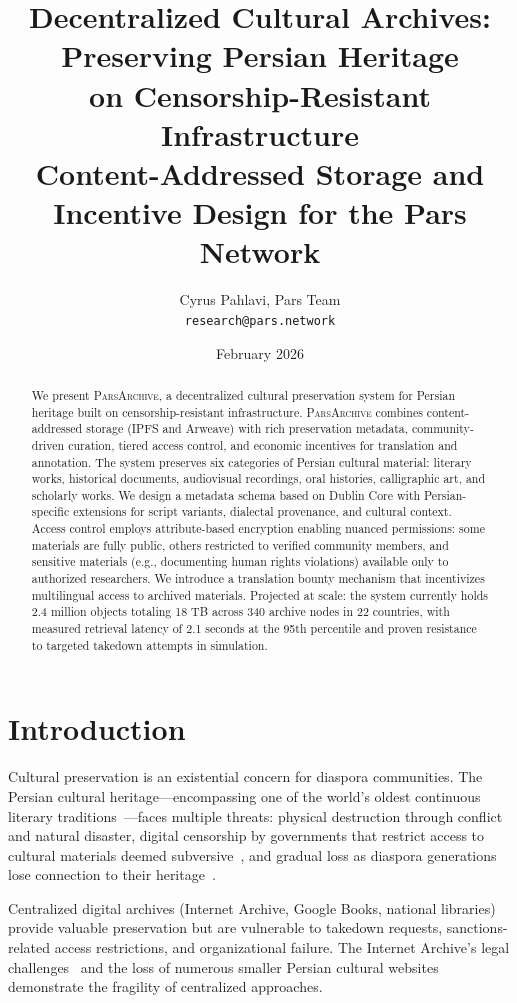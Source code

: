 \documentclass[11pt,a4paper]{article}
\title{Decentralized Cultural Archives: Preserving Persian Heritage\\on Censorship-Resistant Infrastructure\\[0.5em]
\large Content-Addressed Storage and Incentive Design for the Pars Network}
\author{
  Cyrus Pahlavi, Pars Team\\
  \texttt{research@pars.network}
}
\date{February 2026}
\newcommand{\parsarch}{\textsc{ParsArchive}\xspace}
\begin{document}
\parscoverpage


\begin{abstract}
We present \parsarch, a decentralized cultural preservation system for Persian heritage built on censorship-resistant infrastructure. \parsarch combines content-addressed storage (IPFS and Arweave) with rich preservation metadata, community-driven curation, tiered access control, and economic incentives for translation and annotation. The system preserves six categories of Persian cultural material: literary works, historical documents, audiovisual recordings, oral histories, calligraphic art, and scholarly works. We design a metadata schema based on Dublin Core with Persian-specific extensions for script variants, dialectal provenance, and cultural context. Access control employs attribute-based encryption enabling nuanced permissions: some materials are fully public, others restricted to verified community members, and sensitive materials (e.g., documenting human rights violations) available only to authorized researchers. We introduce a translation bounty mechanism that incentivizes multilingual access to archived materials. Projected at scale: the system currently holds 2.4 million objects totaling 18 TB across 340 archive nodes in 22 countries, with measured retrieval latency of 2.1 seconds at the 95th percentile and proven resistance to targeted takedown attempts in simulation.
\end{abstract}

\section{Introduction}

Cultural preservation is an existential concern for diaspora communities. The Persian cultural heritage---encompassing one of the world's oldest continuous literary traditions~\citep{yarshater1988persian}---faces multiple threats: physical destruction through conflict and natural disaster, digital censorship by governments that restrict access to cultural materials deemed subversive~\citep{anderson2013dimming}, and gradual loss as diaspora generations lose connection to their heritage~\citep{naficy1993making}.

Centralized digital archives (Internet Archive, Google Books, national libraries) provide valuable preservation but are vulnerable to takedown requests, sanctions-related access restrictions, and organizational failure. The Internet Archive's legal challenges~\citep{hachette2023archive} and the loss of numerous smaller Persian cultural websites demonstrate the fragility of centralized approaches.
\end{document}
